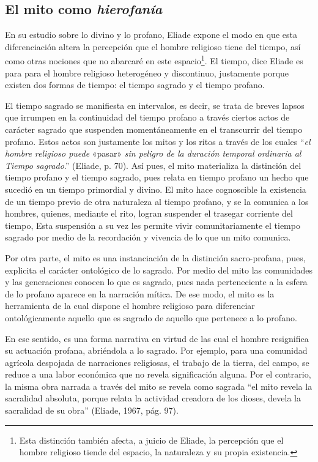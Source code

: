 \begin{refsection}
\section{El mito como \emph{hierofanía}}

En su estudio sobre lo divino y lo profano, Eliade expone el modo en que esta diferenciación altera la percepción que el hombre religioso tiene del tiempo, así como otras nociones que no abarcaré en este espacio\footnote{Esta distinción también afecta, a juicio de Eliade, la percepción que el hombre religioso tiende del espacio, la naturaleza y su propia existencia.}. El tiempo, dice Eliade es para para el hombre religioso heterogéneo y discontinuo, justamente porque existen dos formas de tiempo: el tiempo sagrado y el tiempo profano.

El tiempo sagrado se manifiesta en intervalos, es decir, se trata de breves lapsos que irrumpen en la continuidad del tiempo profano a través ciertos actos de carácter sagrado que suspenden momentáneamente en el transcurrir del tiempo profano. Estos actos son justamente los mitos y los ritos a través de los cuales ``\emph{el hombre religioso puede} «pasar» \emph{sin peligro de la duración temporal ordinaria al Tiempo sagrado}.'' (Eliade, p. 70). Así pues, el mito materializa la distinción del tiempo profano y el tiempo sagrado, pues relata en tiempo profano un hecho que sucedió en un tiempo primordial y divino. El mito hace cognoscible la existencia de un tiempo previo de otra naturaleza al tiempo profano, y se la comunica a los hombres, quienes, mediante el rito, logran suspender el trasegar corriente del tiempo, Esta suspensión a su vez les permite vivir comunitariamente el tiempo sagrado por medio de la recordación y vivencia de lo que un mito comunica.

Por otra parte, el mito es una instanciación de la distinción sacro-profana, pues, explicita el carácter ontológico de lo sagrado. Por medio del mito las comunidades y las generaciones conocen lo que es sagrado, pues nada perteneciente a la esfera de lo profano aparece en la narración mítica. De ese modo, el mito es la herramienta de la cual dispone el hombre religioso para diferenciar ontológicamente aquello que es sagrado de aquello que pertenece a lo profano.

En ese sentido, es una forma narrativa en virtud de las cual el hombre resignifica su actuación profana, abriéndola a lo sagrado. Por ejemplo, para una comunidad agrícola despojada de narraciones religiosas, el trabajo de la tierra, del campo, se reduce a una labor económica que no revela significación alguna. Por el contrario, la misma obra narrada a través del mito se revela como sagrada ``el mito revela la sacralidad absoluta, porque relata la actividad creadora de los dioses, devela la sacralidad de su obra'' (Eliade, 1967, pág. 97).


\end{refsection}
